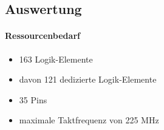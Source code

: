 \subsection{Auswertung}
	\paragraph{Ressourcenbedarf}
	\begin{itemize} 
	\item 163 Logik-Elemente
	\item davon 121 dedizierte Logik-Elemente
	\item 35 Pins 
	\item maximale Taktfrequenz von 225 MHz
	\end{itemize}

